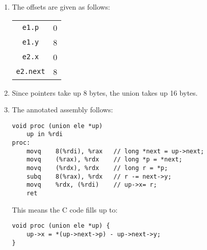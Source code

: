 \documentclass[12pt]{article}
\newenvironment{sol}[1][Solution]{\begin{trivlist}
		\item[\hskip \labelsep {\bfseries #1:}]}{\end{trivlist}}
\begin{document}
{\begin{sol}
	\begin{enumerate}[label=(\alph*)]
		\item The offsets are given as follows:
		\begin{center}
			\begin{tabular}{cc}
				\texttt{e1.p} & 0\\
				\texttt{e1.y} & 8\\
				\texttt{e2.x} & 0\\
				\texttt{e2.next} & 8
			\end{tabular}
		\end{center}
		\item Since pointers take up 8 bytes, the union takes up
		16 bytes.
		\item The annotated assembly follows:
		\begin{lstlisting}[language={}]
	void proc (union ele *up)
	up in %rdi
proc:
	movq	8(%rdi), %rax	// long *next = up->next;
	movq	(%rax), %rdx	// long *p = *next;
	movq	(%rdx), %rdx	// long r = *p;
	subq	8(%rax), %rdx	// r -= next->y;
	movq	%rdx, (%rdi)	// up->x= r;
	ret
		\end{lstlisting}
		This means the C code fills up to:
		\begin{lstlisting}
void proc (union ele *up) {
	up->x = *(up->next->p) - up->next->y;
}
		\end{lstlisting}
	\end{enumerate}
\end{sol}
\end{document}
